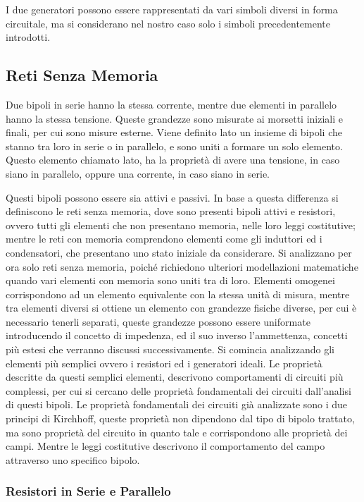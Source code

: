 \documentclass{article}
\numberwithin{equation}{subsection}
\begin{document}
I due generatori possono essere rappresentati da vari simboli diversi in forma circuitale, ma si considerano nel nostro caso solo i simboli precedentemente introdotti.  

\subsection{Reti Senza Memoria}

Due bipoli in serie hanno la stessa corrente, mentre due elementi in parallelo hanno la stessa tensione. Queste grandezze sono misurate ai morsetti iniziali e finali, per cui 
sono misure esterne. 
Viene definito lato un insieme di bipoli che stanno tra loro in serie o in parallelo, e sono uniti a formare un solo elemento. Questo elemento chiamato lato, ha la proprietà di avere 
una tensione, in caso siano in parallelo, oppure una corrente, in caso siano in serie. 

Questi bipoli possono essere sia attivi e passivi. In base a questa differenza si definiscono le reti senza memoria, dove sono presenti bipoli attivi e resistori, ovvero tutti 
gli elementi che non presentano memoria, nelle loro leggi costitutive; mentre le reti con memoria comprendono elementi come gli induttori ed i condensatori, che presentano 
uno stato iniziale da considerare. Si analizzano per ora solo reti senza memoria, poiché richiedono ulteriori modellazioni matematiche 
quando vari elementi con memoria sono uniti tra di loro. Elementi omogenei corrispondono ad un elemento equivalente con la stessa unità di misura, mentre tra elementi diversi 
si ottiene un elemento con grandezze fisiche diverse, per cui è necessario tenerli separati, queste grandezze possono essere uniformate introducendo il concetto di impedenza, 
ed il suo inverso l'ammettenza, concetti più estesi che verranno discussi successivamente. Si comincia analizzando gli elementi più semplici ovvero i resistori ed i generatori 
ideali. Le proprietà descritte da questi semplici elementi, descrivono comportamenti di circuiti più complessi, per cui si cercano delle proprietà fondamentali dei circuiti 
dall'analisi di questi bipoli. Le proprietà fondamentali dei circuiti già analizzate sono i due principi di Kirchhoff, queste proprietà non dipendono dal tipo di bipolo trattato, 
ma sono proprietà del circuito in quanto tale e corrispondono alle proprietà dei campi. Mentre le leggi costitutive descrivono il comportamento del campo attraverso uno 
specifico bipolo.   

\subsubsection{Resistori in Serie e Parallelo}
\end{document}
